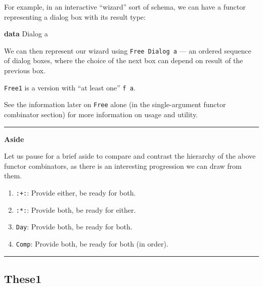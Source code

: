 \documentclass[]{article}
\newenvironment{Shaded}{}{}
\newcommand{\DataTypeTok}[1]{\textcolor[rgb]{0.56,0.13,0.00}{#1}}
\newcommand{\KeywordTok}[1]{\textcolor[rgb]{0.00,0.44,0.13}{\textbf{#1}}}
\newcommand{\NormalTok}[1]{#1}
\begin{document}
\begin{itemize}
  For example, in an interactive ``wizard'' sort of schema, we can have a
  functor representing a dialog box with its result type:

\begin{Shaded}
\begin{Highlighting}[]
\KeywordTok{data} \DataTypeTok{Dialog}\NormalTok{ a}
\end{Highlighting}
\end{Shaded}

  We can then represent our wizard using \texttt{Free\ Dialog\ a} --- an ordered
  sequence of dialog boxes, where the choice of the next box can depend on
  result of the previous box.

  \texttt{Free1} is a version with ``at least one'' \texttt{f\ a}.

  See the information later on \texttt{Free} alone (in the single-argument
  functor combinator section) for more information on usage and utility.
\end{itemize}

\begin{center}\rule{0.5\linewidth}{\linethickness}\end{center}

\textbf{Aside}

Let us pause for a brief aside to compare and contrast the hierarchy of the
above functor combinators, as there is an interesting progression we can draw
from them.

\begin{enumerate}
\def\labelenumi{\arabic{enumi}.}
\tightlist
\item
  \texttt{:+:}: Provide either, be ready for both.
\item
  \texttt{:*:}: Provide both, be ready for either.
\item
  \texttt{Day}: Provide both, be ready for both.
\item
  \texttt{Comp}: Provide both, be ready for both (in order).
\end{enumerate}

\begin{center}\rule{0.5\linewidth}{\linethickness}\end{center}

\hypertarget{these1}{%
\subsection{These1}\label{these1}}
\end{document}
